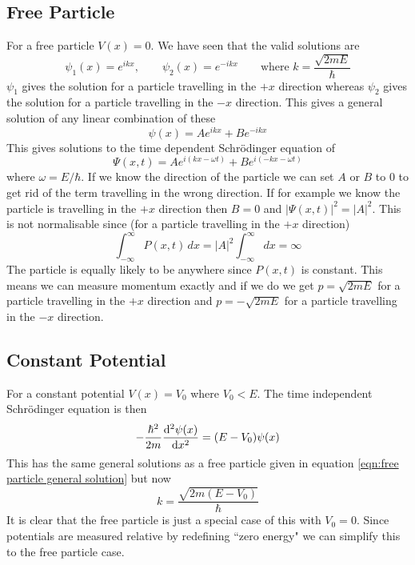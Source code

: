 \documentclass{article}
\begin{document}
    \subsection{Free Particle}
    For a free particle \(V(x) = 0\).
    We have seen that the valid solutions are
    \[\psi_1(x) = e^{ikx}, \qquad \psi_2(x) = e^{-ikx} \qquad \text{where } k = \frac{\sqrt{2mE}}{\hbar}\]
    \(\psi_1\) gives the solution for a particle travelling in the \(+x\) direction whereas \(\psi_2\) gives the solution for a particle travelling in the \(-x\) direction.
    This gives a general solution of any linear combination of these
    \[\psi(x) = Ae^{ikx} + Be^{-ikx}\]
    This gives solutions to the time dependent Schr\"odinger equation of
    \begin{equation}\label{eqn:free particle general solution}
        \Psi(x, t) = Ae^{i(kx - \omega t)} + Be^{i(-kx - \omega t)}
    \end{equation}
    where \(\omega = E/\hbar\).
    If we know the direction of the particle we can set \(A\) or \(B\) to 0 to get rid of the term travelling in the wrong direction.
    If for example we know the particle is travelling in the \(+x\) direction then \(B = 0\) and \(|\Psi(x, t)|^2 = |A|^2\).
    This is not normalisable since (for a particle travelling in the \(+x\) direction)
    \[\int_{-\infty}^\infty P(x, t)\,dx = |A|^2\int_{-\infty}^\infty dx = \infty\]
    The particle is equally likely to be anywhere since \(P(x, t)\) is constant.
    This means we can measure momentum exactly and if we do we get \(p = \sqrt{2mE}\) for a particle travelling in the \(+x\) direction and \(p = -\sqrt{2mE}\) for a particle travelling in the \(-x\) direction.
    
    \subsection{Constant Potential}
    For a constant potential \(V(x) = V_0\) where \(V_0 < E\).
    The time independent Schr\"odinger equation is then
    \[-\frac{\hbar^2}{2m}\dv[2]{\psi(x)}{x} = (E - V_0)\psi(x)\]
    This has the same general solutions as a free particle given in equation \ref{eqn:free particle general solution} but now
    \[k = \frac{\sqrt{2m(E - V_0)}}{\hbar}\]
    It is clear that the free particle is just a special case of this with \(V_0 = 0\).
    Since potentials are measured relative by redefining ``zero energy" we can simplify this to the free particle case.
    
\end{document}
